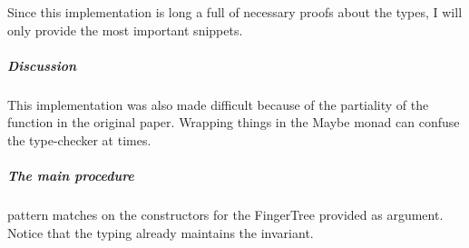 \documentclass[12pt,twoside,notitlepage]{report}
\begin{document}
Since this implementation is long a full of necessary proofs about the types, I will only provide the most important snippets.

\subparagraph{Discussion} This implementation was also made difficult because of the partiality of the function in the original paper. Wrapping things in the Maybe monad can confuse the type-checker at times.

\subparagraph{The main procedure} pattern matches on the constructors for the FingerTree provided as argument. Notice that the typing already maintains the invariant.

\begin{code}
\\
\>[0]\<[2]%
\>[2] \AgdaSymbol{:}  \AgdaSymbol{\{}\AgdaSymbol{\}} \AgdaSymbol{\{} \AgdaSymbol{:}  \AgdaSymbol{\}} \AgdaSymbol{\{} \AgdaSymbol{:}  \AgdaSymbol{\}}\<%
\\
\>[2]\<[14]%
\>[14]  \AgdaSymbol{:}   \<%
\\
\>[2]\<[14]%
\>[14]  \AgdaSymbol{:}    \<%
\\
\>[2]\<[14]%
\>[14]\AgdaSymbol{\{} \AgdaSymbol{:} \AgdaSymbol{\}} \<%
\\
\>[2]\<[14]%
\>[14] \AgdaSymbol{(} \AgdaSymbol{:}   \AgdaSymbol{)}  \AgdaSymbol{(} \AgdaSymbol{:} \AgdaSymbol{)} \<%
\\
\>[2]\<[14]%
\>[14] \AgdaSymbol{(} \AgdaSymbol{:}    \AgdaSymbol{\{}\AgdaSymbol{\})} \<%
\\
\>[2]\<[14]%
\>[14]  \AgdaSymbol{(}   \AgdaSymbol{\{}\AgdaSymbol{\})}\<%
\\
\>[0]\<[2]%
\>[2]   \<%

\end{code}
\end{document}
